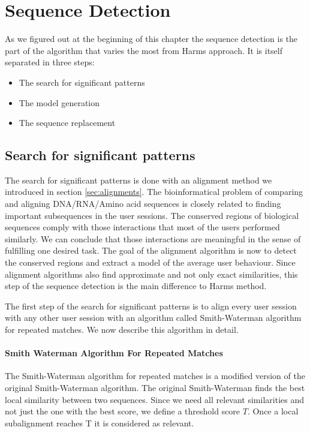 \section{Sequence Detection}
As we figured out at the beginning of this chapter the sequence detection is the part of the algorithm that varies the most from Harms approach.
It is itself separated in three steps:
\begin{itemize}
	\item The search for significant patterns
	\item The model generation
	\item The sequence replacement
\end{itemize}

\subsection{Search for significant patterns}		
The search for significant patterns is done with an alignment method we introduced in section \ref{sec:alignments}. 
The bioinformatical problem of comparing and aligning DNA/RNA/Amino acid sequences is closely related to finding important subsequences in the user sessions. 
The conserved regions of biological sequences comply with those interactions that most of the users performed similarly. 
We can conclude that those interactions are meaningful in the sense of fulfilling one desired task.
The goal of the alignment algorithm is now to detect the conserved regions and extract a model of the average user behaviour. 
Since alignment algorithms also find approximate and not only exact similarities, this step of the sequence detection is the main difference to Harms method.

The first step of the search for significant patterns is to align every user session with any other user session with an algorithm called Smith-Waterman algorithm for repeated matches.
We now describe this algorithm in detail.

\paragraph{Smith Waterman Algorithm For Repeated Matches}
The Smith-Waterman algorithm for repeated matches\cite{durbin1998} is a modified version of the original Smith-Waterman algorithm\cite{waterman1981}.
The original Smith-Waterman finds the best local similarity between two sequences.
Since we need all relevant similarities and not just the one with the best score, we define a threshold score $T$.
Once a local subalignment reaches T it is considered as relevant.

